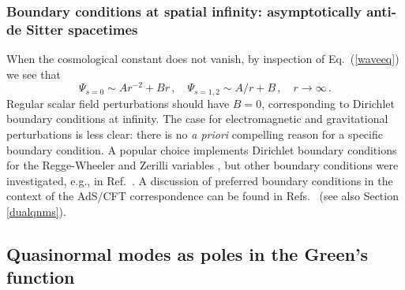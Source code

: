 \documentclass[]{iopart}
\def\be{\begin{equation}}
\def\ee{\end{equation}}
\begin{document}
\subsubsection*{Boundary conditions at spatial infinity: asymptotically
  anti-de Sitter spacetimes}

When the cosmological constant does not vanish, by inspection of
Eq.~(\ref{waveeq}) we see that
%
\be
\Psi_{s=0} \sim Ar^{-2}+Br\,,\quad \Psi_{s=1,2} \sim A/r+B\,,\quad r\rightarrow \infty\,.
\ee
%
Regular scalar field perturbations should have $B=0$, corresponding to
Dirichlet boundary conditions at infinity.  The case for electromagnetic and
gravitational perturbations is less clear: there is no {\it a priori}
compelling reason for a specific boundary condition. A popular choice
implements Dirichlet boundary conditions for the Regge-Wheeler and Zerilli
variables \cite{Cardoso:2001bb}, but other boundary conditions were
investigated, e.g., in Ref.~\cite{Moss:2001ga}. A discussion of preferred
boundary conditions in the context of the AdS/CFT correspondence can be found
in Refs.~\cite{Michalogiorgakis:2006jc,Bakas:2008gz,Bakas:2008zg} (see also
Section \ref{dualqnms}).
\subsection{\label{inversioncontour}Quasinormal modes as poles in the Green's function}
\end{document}
